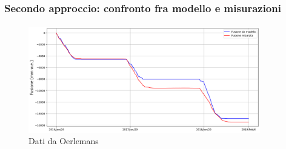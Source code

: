 \begin{frame}
    \frametitle{Secondo approccio: confronto fra modello e misurazioni}
    \framesubtitle{}

    \begin{figure}
        \includegraphics[width=0.9\textwidth]{Immagini/fusioneAlt.png}
        \caption{Dati da Oerlemans}
    \end{figure}
  
\end{frame}